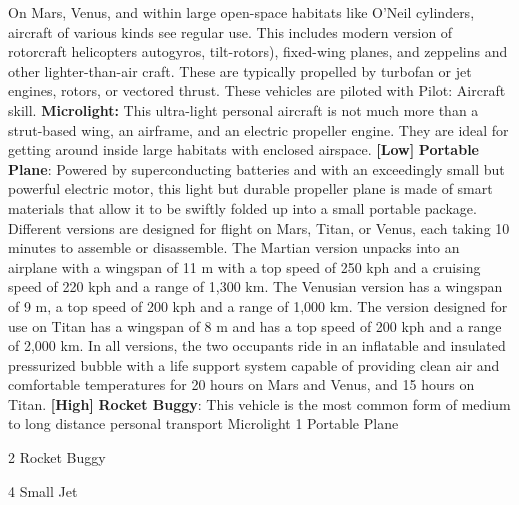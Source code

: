 On Mars, Venus, and within large open-space habitats 
like O'Neil cylinders, aircraft of various kinds see regular 
use. This includes modern version of rotorcraft helicopters
autogyros, tilt-rotors), fixed-wing planes, and zeppelins
and other lighter-than-air craft. These are typically
propelled by turbofan or jet engines, rotors, or vectored 
thrust. These vehicles are piloted with Pilot: Aircraft skill.
\textbf{Microlight:} This ultra-light personal aircraft is 
not much more than a strut-based wing, an airframe, 
and an electric propeller engine. They are ideal for 
getting around inside large habitats with enclosed 
airspace. \textbf{[Low]}
\textbf{Portable Plane}: Powered by superconducting batteries
and with an exceedingly small but powerful
electric motor, this light but durable propeller plane 
is made of smart materials that allow it to be swiftly 
folded up into a small portable package. Different versions
are designed for flight on Mars, Titan, or Venus,
each taking 10 minutes to assemble or disassemble. 
The Martian version unpacks into an airplane with a 
wingspan of 11 m with a top speed of 250 kph and a 
cruising speed of 220 kph and a range of 1,300 km. 
The Venusian version has a wingspan of 9 m, a top 
speed of 200 kph and a range of 1,000 km. The version
designed for use on Titan has a wingspan of 8
m and has a top speed of 200 kph and a range of 
2,000 km. In all versions, the two occupants ride in 
an inflatable and insulated pressurized bubble with a 
life support system capable of providing clean air and 
comfortable temperatures for 20 hours on Mars and 
Venus, and 15 hours on Titan. \textbf{[High]}
\textbf{Rocket Buggy}: This vehicle is the most common 
form of medium to long distance personal transport 
Microlight 1
Portable Plane

2
Rocket Buggy

4
Small Jet

